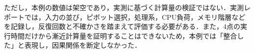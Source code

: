 ただし，本例の数値は架空であり，実測に基づく計算量の検証ではない．実測レポートでは，入力の並び，ピボット選択，処理系，CPU負荷，メモリ階層などを記録し，反復回数と不確かさを踏まえて評価する必要がある．また，4点の実行時間だけから漸近計算量を証明することはできないため，本例では「整合した」と表現し，因果関係を断定しなかった．
